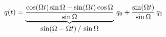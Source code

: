 \documentclass[preview]{standalone}
\begin{document}
\begin{align*}
\special{dvisvgm:raw <g id='unique000'>}q(t)=\underbrace{\frac{\cos(\Omega t)\sin\Omega-\sin(\Omega t)\cos\Omega}{\sin\Omega}}_{\textstyle \sin(\Omega-\Omega t)\,/\,\sin\Omega}\,q_0+\frac{\sin(\Omega t)}{\sin\Omega}\,q_1\special{dvisvgm:raw </g>}
\end{align*}
\end{document}

